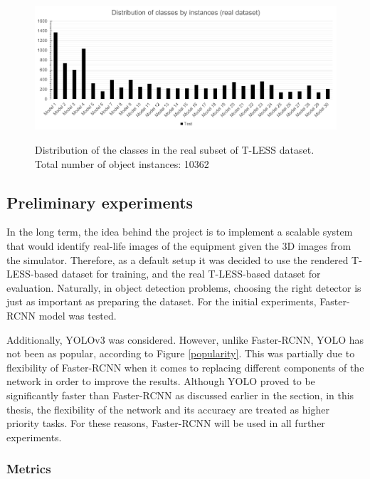 \documentclass[english, 12pt, a4paper, elec, utf8, a-1b, online]{aaltothesis}
\begin{document}
\begin{figure}[htb]
	\begin{center}
		\includegraphics[width=14cm]{./real_distribution.png}
	\end{center}
	\caption{Distribution of the classes in the real subset of T-LESS dataset. Total number of object instances: 10362}
	\begin{center}
		\label{tless_distribution_real}
	\end{center}
\end{figure}
\FloatBarrier

\subsection{Preliminary experiments}
In the long term, the idea behind the project is to implement a scalable system that would identify real-life images of the equipment given the 3D images from the simulator. Therefore, as a default setup it was decided to use the rendered T-LESS-based dataset for training, and the real T-LESS-based dataset for evaluation. Naturally, in object detection problems, choosing the right detector is just as important as preparing the dataset. For the initial experiments, Faster-RCNN \cite{Girshick2015} model was tested.

Additionally, YOLOv3 \cite{Redmon2018a} was considered. However, unlike Faster-RCNN, YOLO has not been as popular, according to Figure \ref{popularity}. This was partially due to flexibility of Faster-RCNN when it comes to replacing different components of the network in order to improve the results. Although YOLO proved to be significantly faster than Faster-RCNN as discussed earlier in the  section, in this thesis, the flexibility of the network and its accuracy are treated  as higher priority tasks. For these reasons, Faster-RCNN will be used in all further experiments.  
   

\subsubsection{Metrics}
\label{metrics_section} 
\end{document}
